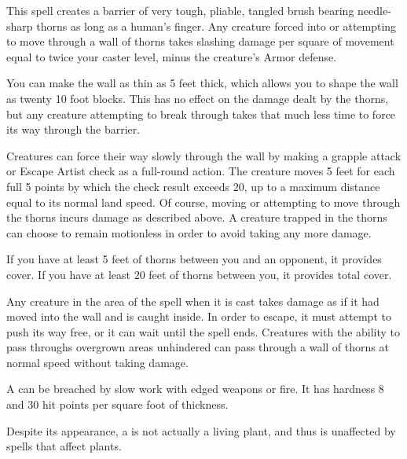 \spelldur{\durlong \dismissable}
\begin{spelleffect}
    This spell creates a barrier of very tough, pliable, tangled brush bearing needle-sharp thorns as long as a human's finger. Any creature forced into or attempting to move through a wall of thorns takes slashing damage per square of movement equal to twice your caster level, minus the creature's Armor defense.
    \par You can make the wall as thin as 5 feet thick, which allows you to shape the wall as twenty 10 foot blocks. This has no effect on the damage dealt by the thorns, but any creature attempting to break through takes that much less time to force its way through the barrier.
    \par Creatures can force their way slowly through the wall by making a grapple attack or Escape Artist check as a full-round action. The creature moves 5 feet for each full 5 points by which the check result exceeds 20, up to a maximum distance equal to its normal land speed. Of course, moving or attempting to move through the thorns incurs damage as described above. A creature trapped in the thorns can choose to remain motionless in order to avoid taking any more damage.
    \par If you have at least 5 feet of thorns between you and an opponent, it provides cover. If you have at least 20 feet of thorns between you, it provides total cover.
    \par Any creature in the area of the spell when it is cast takes damage as if it had moved into the wall and is caught inside. In order to escape, it must attempt to push its way free, or it can wait until the spell ends. Creatures with the ability to pass throughs overgrown areas unhindered can pass through a wall of thorns at normal speed without taking damage.
\end{spelleffect}
\begin{spellnotes}
    A  can be breached by slow work with edged weapons or fire. It has hardness 8 and 30 hit points per square foot of thickness.
    \par Despite its appearance, a  is not actually a living plant, and thus is unaffected by spells that affect plants.
\end{spellnotes}

